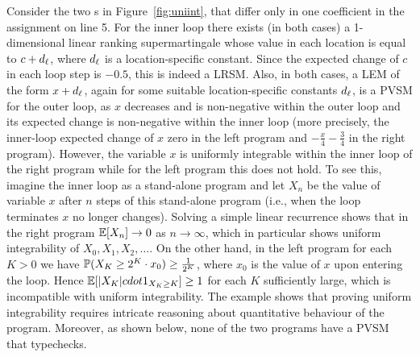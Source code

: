 \begin{example}
Consider the two \APP{}s in Figure~\ref{fig:uniint}, that differ only in one 
coefficient in the 
assignment on line 5. For the inner loop there exists (in both cases) a 
1-dimensional linear ranking supermartingale whose value in each location is 
equal to $c+d_{\ell}$, where $d_{\ell}$ is a location-specific constant. Since 
the expected change of $c$ in each loop step is $-0.5$, this is indeed a LRSM. 
Also, in both cases, a LEM of the form $x+d_{\ell}$, again for some suitable 
location-specific constants $d_{\ell}$, is a PVSM for the outer loop, as $x$ 
decreases and is non-negative within the outer loop and its expected change is 
non-negative within the inner loop (more precisely, the inner-loop expected 
change of $x$ zero in the left program and $-\frac{x}{4} - \frac{3}{4}$ in the 
right 
program). 
However, the variable $x$ is uniformly integrable within the inner loop of the 
right program while for the left program this does not hold. To see this, 
imagine the inner loop as a stand-alone program and let $X_n$ be the value of 
variable $x$ after $n$ steps of this stand-alone program (i.e., when the loop 
terminates $x$ no longer changes). Solving a simple linear recurrence shows 
that in the right program $\mathbb{E}[X_n] \rightarrow 0$ as $n\rightarrow \infty$, 
which in particular shows uniform integrability of $X_0,X_1,X_2,\dots$. On the 
other hand, in the left program for each $K>0$ we have $\mathbb{P}(X_K \geq 
2^K\cdot{x_0})\geq \frac{1}{2^K}$, where $x_0$ is the value of $x$ upon 
entering the loop. Hence $\mathbb{E}[|X_K|cdot{1}_{X_K 
\geq K}]\geq 1$ for each $K$ sufficiently large, which is incompatible with 
uniform integrability. The example shows that proving uniform integrability 
requires intricate reasoning about quantitative behaviour of the program. 
Moreover, as shown below, none of the two programs have a PVSM that typechecks.

\end{example}

